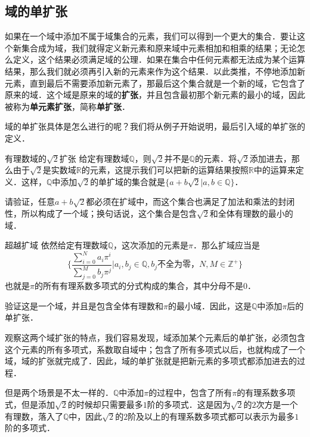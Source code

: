 

\subsection{域的单扩张}
如果在一个域中添加不属于域集合的元素，我们可以得到一个更大的集合．要让这个新集合成为域，我们就得定义新元素和原来域中元素相加和相乘的结果；无论怎么定义，这个结果必须满足域的公理．如果在集合中任何元素都无法成为某个运算结果，那么我们就必须再引入新的元素来作为这个结果．以此类推，不停地添加新元素，直到最后不需要添加新元素了，那最后这个集合就是一个新的域，它包含了原来的域．这个域是原来的域的\textbf{扩张}，并且包含最初那个新元素的最小的域，因此被称为\textbf{单元素扩张}，简称\textbf{单扩张}．

域的单扩张具体是怎么进行的呢？我们将从例子开始说明，最后引入域的单扩张的定义．

\begin{exercise}{有理数域的$\sqrt{2}$扩张}\label{FldExp_exe1}
给定有理数域$\mathbb{Q}$，则$\sqrt{2}$并不是$\mathbb{Q}$的元素．将$\sqrt{2}$添加进去，那么由于$\sqrt{2}$是实数域$\mathbb{R}$的元素，这提示我们可以把新的运算结果按照$\mathbb{R}$中的运算来定义．这样，$\mathbb{Q}$中添加$\sqrt{2}$的单扩域的集合就是$\{a+b\sqrt{2}|a, b\in\mathbb{Q}\}$．

请验证，任意$a+b\sqrt{2}$都必须在扩域中，而这个集合也满足了加法和乘法的封闭性，所以构成了一个域；换句话说，这个集合是包含$\sqrt{2}$和全体有理数的最小的域．
\end{exercise}

\begin{exercise}{超越扩域}\label{FldExp_exe2}
依然给定有理数域$\mathbb{Q}$，这次添加的元素是$\pi$．那么扩域应当是
\begin{equation}
\{\frac{\sum_{i=0}^N a_i\pi^i}{\sum_{j=0}^M b_j\pi^j}|a_i, b_j\in\mathbb{Q}, b_j\text{不全为零，} N, M\in\mathbb{Z}^+\}
\end{equation}
也就是$\pi$的所有有理系数多项式的分式构成的集合，其中分母不是$0$．

验证这是一个域，并且是包含全体有理数和$\pi$的最小域．因此，这是$\mathbb{Q}$中添加$\pi$后的单扩张．
\end{exercise}

观察这两个域扩张的特点，我们容易发现，域添加某个元素后的单扩张，必须包含这个元素的所有多项式，系数取自域中；包含了所有多项式以后，也就构成了一个域，域的扩张就完成了．因此，域的单扩张就是把新元素的多项式都添加进去的过程．

但是两个场景是不太一样的．$\mathbb{Q}$中添加$\pi$的过程中，包含了所有$\pi$的有理系数多项式，但是添加$\sqrt{2}$的时候却只需要最多$1$阶的多项式．这是因为$\sqrt{2}$的$2$次方是一个有理数，落入了$\mathbb{Q}$中，因此$\sqrt{2}$的$2$阶及以上的有理系数多项式都可以表示为最多$1$阶的多项式．

